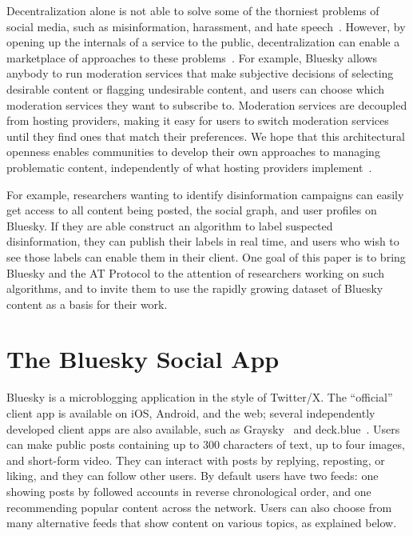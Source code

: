 \documentclass[sigconf]{acmart}
\begin{document}
Decentralization alone is not able to solve some of the thorniest problems of social media, such as misinformation, harassment, and hate speech~\cite{Roth:2023}.
However, by opening up the internals of a service to the public, decentralization can enable a marketplace of approaches to these problems~\cite{Masnick:2019}.
For example, Bluesky allows anybody to run moderation services that make subjective decisions of selecting desirable content or flagging undesirable content, and users can choose which moderation services they want to subscribe to.
Moderation services are decoupled from hosting providers, making it easy for users to switch moderation services until they find ones that match their preferences.
We hope that this architectural openness enables communities to develop their own approaches to managing problematic content, independently of what hosting providers implement~\cite{Masnick:2019}.

For example, researchers wanting to identify disinformation campaigns can easily get access to all content being posted, the social graph, and user profiles on Bluesky.
If they are able construct an algorithm to label suspected disinformation, they can publish their labels in real time, and users who wish to see those labels can enable them in their client.
One goal of this paper is to bring Bluesky and the AT Protocol to the attention of researchers working on such algorithms, and to invite them to use the rapidly growing dataset of Bluesky content as a basis for their work.


\section{The Bluesky Social App}\label{sec:product}

Bluesky is a microblogging application in the style of Twitter/X. %
The ``official'' client app is available on iOS, Android, and the web; several independently developed client apps are also available, such as Graysky~\cite{Graysky} and deck.blue~\cite{deck.blue}.
Users can make public posts containing up to 300 characters of text, up to four images, and short-form video.
They can interact with posts by replying, reposting, or liking, and they can follow other users.
By default users have two feeds: one showing posts by followed accounts in reverse chronological order, and one recommending popular content across the network.
Users can also choose from many alternative feeds that show content on various topics, as explained below.
\end{document}

